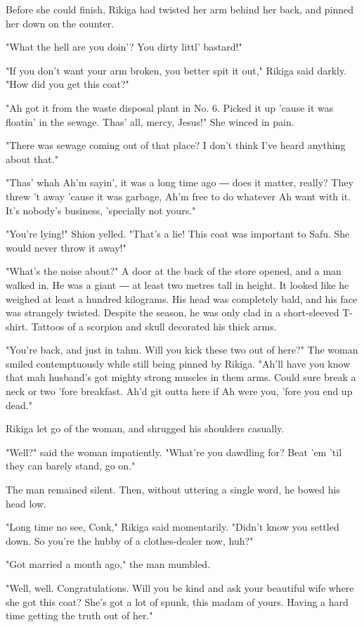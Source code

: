 Before she could finish, Rikiga had twisted her arm behind her back, and
pinned her down on the counter.

"What the hell are you doin'? You dirty littl' bastard!"

"If you don't want your arm broken, you better spit it out," Rikiga said
darkly. "How did you get this coat?"

"Ah got it from the waste disposal plant in No. 6. Picked it up 'cause
it was floatin' in the sewage. Thas' all, mercy, Jesus!" She winced in
pain.

"There was sewage coming out of that place? I don't think I've heard
anything about that."

"Thas' whah Ah'm sayin', it was a long time ago ― does it matter,
really? They threw 't away 'cause it was garbage, Ah'm free to do
whatever Ah want with it. It's nobody's business, 'specially not yours."

"You're lying!" Shion yelled. "That's a lie! This coat was important to
Safu. She would never throw it away!"

"What's the noise about?" A door at the back of the store opened, and a
man walked in. He was a giant ― at least two metres tall in height. It
looked like he weighed at least a hundred kilograms. His head was
completely bald, and his face was strangely twisted. Despite the season,
he was only clad in a short-sleeved T-shirt. Tattoos of a scorpion and
skull decorated his thick arms.

"You're back, and just in tahm. Will you kick these two out of here?"
The woman smiled contemptuously while still being pinned by Rikiga.
"Ah'll have you know that mah husband's got mighty strong muscles in
them arms. Could sure break a neck or two 'fore breakfast. Ah'd git
outta here if Ah were you, 'fore you end up dead."

Rikiga let go of the woman, and shrugged his shoulders casually.

"Well?" said the woman impatiently. "What're you dawdling for? Beat 'em
'til they can barely stand, go on."

The man remained silent. Then, without uttering a single word, he bowed
his head low.

"Long time no see, Conk," Rikiga said momentarily. "Didn't know you
settled down. So you're the hubby of a clothes-dealer now, huh?"

"Got married a month ago," the man mumbled.

"Well, well. Congratulations. Will you be kind and ask your beautiful
wife where she got this coat? She's got a lot of spunk, this madam of
yours. Having a hard time getting the truth out of her."

